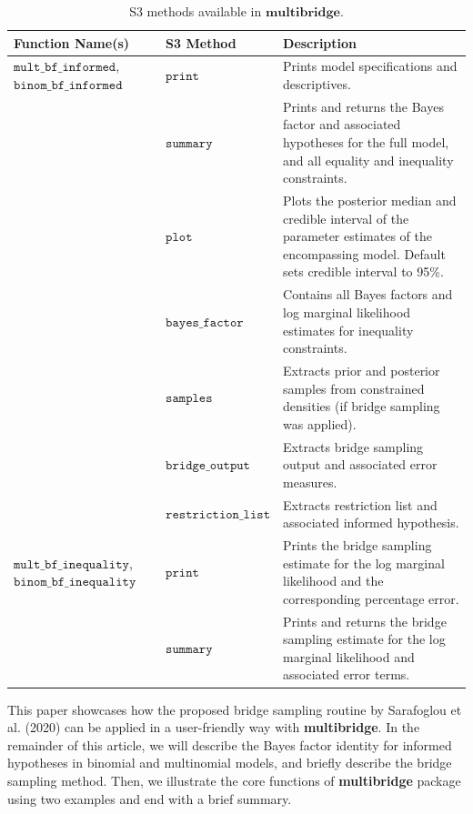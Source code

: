 \documentclass[
  english,
  man,floatsintext]{apa6}
\begin{document}
\begin{table}[H]
\caption {S3 methods available in $\textbf{multibridge}$.}
\label{table:s3_methods}
\begin{center}
\begin{tabular}{p{4cm}p{3.5cm}p{9cm}}
        \toprule
Function Name(s) & S3 Method & Description \\\midrule
$\texttt{mult\_bf\_informed}$, $\texttt{binom\_bf\_informed}$ & $\texttt{print}$ & Prints model specifications and descriptives. \\
 & $\texttt{summary}$ &  Prints and returns the Bayes factor and associated hypotheses for the full model, and all equality and inequality constraints.\\
  & $\texttt{plot}$ & Plots the posterior median and credible interval of the parameter estimates of the encompassing model. Default sets credible interval to 95\%.\\
 & $\texttt{bayes\_factor}$ & Contains all Bayes factors and log marginal likelihood estimates for inequality constraints.\\
 & $\texttt{samples}$ & Extracts prior and posterior samples from constrained densities (if bridge sampling was applied). \\
& $\texttt{bridge\_output}$  &  Extracts bridge sampling output and associated error measures.\\
& $\texttt{restriction\_list}$ & Extracts restriction list and associated informed hypothesis. \\
$\texttt{mult\_bf\_inequality}$, $\texttt{binom\_bf\_inequality}$  & $\texttt{print}$ & Prints the bridge sampling estimate for the log marginal likelihood and the corresponding percentage error. \\
& $\texttt{summary}$ & Prints and returns the bridge sampling estimate for the log marginal likelihood and associated error terms.\\
\bottomrule
\end{tabular}
\end{center}
\end{table}

\noindent This paper showcases how the proposed bridge sampling routine by Sarafoglou et al. (2020) can be applied in a user-friendly way with \textbf{multibridge}. In the remainder of this article, we will describe the Bayes factor identity for informed hypotheses in binomial and multinomial models, and briefly describe the bridge sampling method. Then, we illustrate the core functions of \textbf{multibridge} package using two examples and end with a brief summary.
\end{document}
